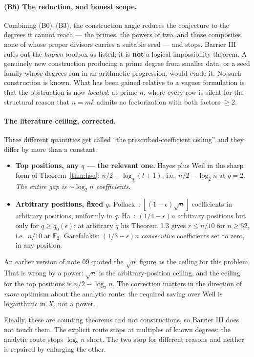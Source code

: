 \documentclass[10pt]{article}
\theoremstyle{plain}
\theoremstyle{definition}
\newcommand{\F}{\mathbb F}
\newcommand{\flr}[1]{\left\lfloor #1\right\rfloor}
\begin{document}
\paragraph{(B5) The reduction, and honest scope.} Combining (B0)--(B3), the
construction angle reduces the conjecture to the degrees it cannot reach --- the
primes, the powers of two, and those composites none of whose proper divisors
carries a suitable seed --- and stops. Barrier III rules out the \emph{known}
toolbox as listed; it is \textbf{not} a logical impossibility theorem. A
genuinely new construction producing a prime degree from smaller data, or a
seed family whose degrees run in an arithmetic progression, would evade it. No
such construction is known. What has been gained relative to a vaguer
formulation is that the obstruction is now \emph{located}: at prime $n$, where
every row is silent for the structural reason that $n=mk$ admits no
factorization with both factors $\ge2$.

\paragraph{The literature ceiling, corrected.} Three different quantities get
called ``the prescribed-coefficient ceiling'' and they differ by more than a
constant.
\begin{itemize}
\item \textbf{Top positions, any $q$ --- the relevant one.} Hayes plus Weil in
the sharp form of Theorem~\ref{thm:hsu}: $n/2-\log_q(l+1)$, i.e.\
$n/2-\log_2 n$ at $q=2$. \emph{The entire gap is $\sim\log_2 n$ coefficients.}
\item \textbf{Arbitrary positions, fixed $q$.} Pollack~\cite{Pollack}:
$\flr{(1-\epsilon)\sqrt n}$ coefficients in arbitrary positions, uniformly in
$q$. Ha~\cite{Ha}: $(1/4-\epsilon)n$ arbitrary positions but only for
$q\ge q_0(\epsilon)$; at arbitrary $q$ his Theorem 1.3 gives $r\le n/10$ for
$n\ge52$, i.e.\ $n/10$ at $\F_2$. Garefalakis: $(1/3-\epsilon)n$
\emph{consecutive} coefficients set to zero, in any position.
\end{itemize}
An earlier version of note 09 quoted the $\sqrt n$ figure as the ceiling for
this problem. That is wrong by a power: $\sqrt n$ is the arbitrary-position
ceiling, and the ceiling for the top positions is $n/2-\log_2 n$. The
correction matters in the direction of \emph{more} optimism about the analytic
route: the required saving over Weil is logarithmic in $X$, not a power.

Finally, these are counting theorems and not constructions, so Barrier III does
not touch them. The explicit route stops at multiples of known degrees; the
analytic route stops $\log_2 n$ short. The two stop for different reasons and
neither is repaired by enlarging the other.
\end{document}
